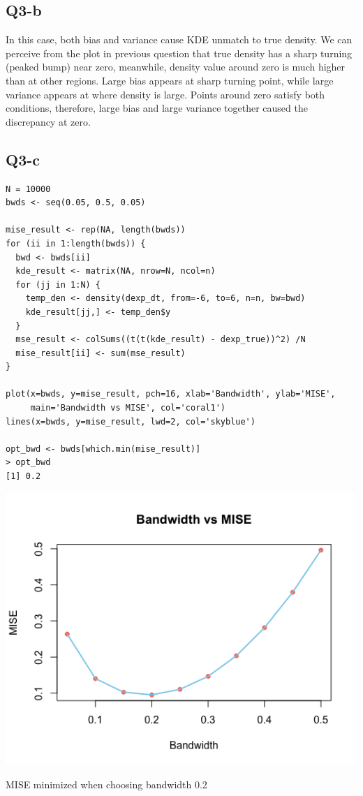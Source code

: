 \documentclass[12pt,letterpaper]{article}
\begin{document}
\subsection*{Q3-b}
\noindent In this case, both bias and variance cause KDE unmatch to true density. We can perceive from the plot in previous question that true density has a sharp turning (peaked bump) near zero, meanwhile, density value around zero is much higher than at other regions. Large bias appears at sharp turning point, while large variance appears at where density is large. Points around zero satisfy both conditions, therefore, large bias and large variance together caused the discrepancy at zero. 

\subsection*{Q3-c}
\begin{verbatim}
N = 10000
bwds <- seq(0.05, 0.5, 0.05)

mise_result <- rep(NA, length(bwds))
for (ii in 1:length(bwds)) {
  bwd <- bwds[ii]
  kde_result <- matrix(NA, nrow=N, ncol=n)
  for (jj in 1:N) {
    temp_den <- density(dexp_dt, from=-6, to=6, n=n, bw=bwd)
    kde_result[jj,] <- temp_den$y
  }
  mse_result <- colSums((t(t(kde_result) - dexp_true))^2) /N
  mise_result[ii] <- sum(mse_result)
}

plot(x=bwds, y=mise_result, pch=16, xlab='Bandwidth', ylab='MISE', 
     main='Bandwidth vs MISE', col='coral1')
lines(x=bwds, y=mise_result, lwd=2, col='skyblue')

opt_bwd <- bwds[which.min(mise_result)]
> opt_bwd
[1] 0.2
\end{verbatim}

\includegraphics[scale=0.7]{q3-c.png}

\noindent MISE minimized when choosing bandwidth 0.2
\end{document}
